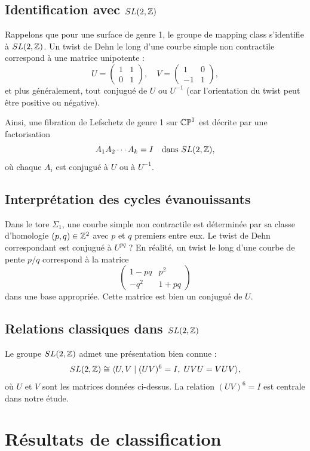 \subsection{Identification avec $SL(2,\mathbb{Z})$}

Rappelons que pour une surface de genre 1, le groupe de mapping class s'identifie à $SL(2,\mathbb{Z})$. Un twist de Dehn le long d'une courbe simple non contractile correspond à une matrice unipotente :
\[
U = \begin{pmatrix} 1 & 1 \\ 0 & 1 \end{pmatrix}, \quad V = \begin{pmatrix} 1 & 0 \\ -1 & 1 \end{pmatrix},
\]
et plus généralement, tout conjugué de $U$ ou $U^{-1}$ (car l'orientation du twist peut être positive ou négative).

Ainsi, une fibration de Lefschetz de genre 1 sur $\mathbb{CP}^1$ est décrite par une factorisation
\[
A_1 A_2 \cdots A_k = I \quad \text{dans } SL(2,\mathbb{Z}),
\]
où chaque $A_i$ est conjugué à $U$ ou à $U^{-1}$.

\subsection{Interprétation des cycles évanouissants}

Dans le tore $\Sigma_1$, une courbe simple non contractile est déterminée par sa classe d'homologie $(p,q) \in \mathbb{Z}^2$ avec $p$ et $q$ premiers entre eux. Le twist de Dehn correspondant est conjugué à $U^{pq}$ ? En réalité, un twist le long d'une courbe de pente $p/q$ correspond à la matrice
\[
\begin{pmatrix} 1 - pq & p^2 \\ -q^2 & 1 + pq \end{pmatrix}
\]
dans une base appropriée. Cette matrice est bien un conjugué de $U$.

\subsection{Relations classiques dans $SL(2,\mathbb{Z})$}

Le groupe $SL(2,\mathbb{Z})$ admet une présentation bien connue :
\[
SL(2,\mathbb{Z}) \cong \langle U, V \mid (UV)^6 = I, \; U V U = V U V \rangle,
\]
où $U$ et $V$ sont les matrices données ci-dessus. La relation $(UV)^6 = I$ est centrale dans notre étude.

\section{Résultats de classification}

